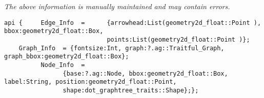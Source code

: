 \label{pkg:planar\_graphtree\_traits}

{\tiny \it The above information is manually maintained and may contain errors.}
\begin{verbatim}
api {     Edge_Info  =      {arrowhead:List(geometry2d_float::Point ), bbox:geometry2d_float::Box,
                            points:List(geometry2d_float::Point )};
    Graph_Info  = {fontsize:Int, graph:?.ag::Traitful_Graph, graph_bbox:geometry2d_float::Box};
          Node_Info  =
                {base:?.ag::Node, bbox:geometry2d_float::Box, label:String, position:geometry2d_float::Point,
                shape:dot_graphtree_traits::Shape};};
\end{verbatim}
